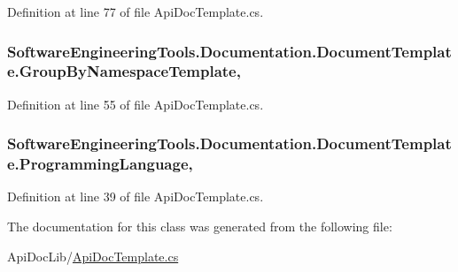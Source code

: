 Definition at line 77 of file Api\+Doc\+Template.\+cs.

\hypertarget{class_software_engineering_tools_1_1_documentation_1_1_document_template_af33f12cad0d5b98a85bb608275611919}{
\subsubsection[{Group\+By\+Namespace\+Template}]{ Software\+Engineering\+Tools.\+Documentation.\+Document\+Template.\+Group\+By\+Namespace\+Template\hspace{0.3cm}{\ttfamily [static]}, {\ttfamily [get]}}}\label{class_software_engineering_tools_1_1_documentation_1_1_document_template_af33f12cad0d5b98a85bb608275611919}


Definition at line 55 of file Api\+Doc\+Template.\+cs.

\hypertarget{class_software_engineering_tools_1_1_documentation_1_1_document_template_abaeea2816e2833c167ac1ce2433c16f1}{
\subsubsection[{Programming\+Language}]{ Software\+Engineering\+Tools.\+Documentation.\+Document\+Template.\+Programming\+Language\hspace{0.3cm}{\ttfamily [get]}, {\ttfamily [set]}}}\label{class_software_engineering_tools_1_1_documentation_1_1_document_template_abaeea2816e2833c167ac1ce2433c16f1}


Definition at line 39 of file Api\+Doc\+Template.\+cs.



The documentation for this class was generated from the following file\+:\begin{DoxyCompactItemize}
\item 
Api\+Doc\+Lib/\hyperlink{_api_doc_template_8cs}{Api\+Doc\+Template.\+cs}\end{DoxyCompactItemize}
